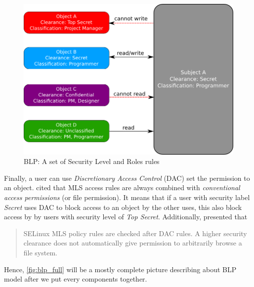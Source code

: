\begin{figure}[bth]
\myfloatalign
\includegraphics[width=1.0\linewidth]{gfx/chapter_2/blp_security_level_roles_rules}
\caption[BLP: A set of Security Level and Roles rules]{BLP: A set of Security Level and Roles rules}
\label{fig:blp_security_level_roles_rules}
\end{figure}

Finally, a user can use \emph{Discretionary Access Control} (DAC) set the permission to an object.
\cite{centos:2008} cited that MLS access rules are always combined with \emph{conventional access permissions} (or file permission).
It means that if a user with security label \emph{Secret} uses DAC to block access to an object by the other uses, this also block access by by users with security level of \emph{Top Secret}.
Additionally, \cite{bancinco:2015} presented that
\begin{quote}
SELinux MLS policy rules are checked after DAC rules. A higher security clearance does not automatically give permission to arbitrarily browse a file system.
\end{quote}
Hence, \autoref{fig:blp_full} will be a mostly complete picture describing about BLP model after we put every components together.

